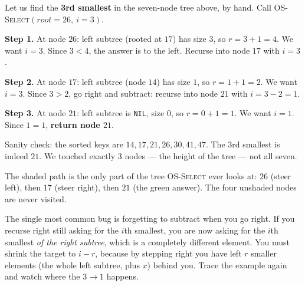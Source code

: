 \begin{labbox}
Let us find the \textbf{3rd smallest} in the seven-node tree above, by hand.
Call \textsc{OS-Select}$(\mathit{root}=26,\ i=3)$.

\textbf{Step 1.} At node $26$: left subtree (rooted at $17$) has size $3$, so
$r = 3 + 1 = 4$. We want $i = 3$. Since $3 < 4$, the answer is to the left.
Recurse into node $17$ with $i = 3$.

\textbf{Step 2.} At node $17$: left subtree (node $14$) has size $1$, so
$r = 1 + 1 = 2$. We want $i = 3$. Since $3 > 2$, go right and subtract:
recurse into node $21$ with $i = 3 - 2 = 1$.

\textbf{Step 3.} At node $21$: left subtree is \texttt{NIL}, size $0$, so
$r = 0 + 1 = 1$. We want $i = 1$. Since $1 = 1$, \textbf{return node $21$}.

Sanity check: the sorted keys are $14, 17, 21, 26, 30, 41, 47$. The 3rd smallest
is indeed $21$. We touched exactly $3$ nodes --- the height of the tree --- not all
seven.

\begin{center}
\end{center}

The shaded path is the only part of the tree \textsc{OS-Select} ever looks at:
$26$ (steer left), then $17$ (steer right), then $21$ (the green answer). The
four unshaded nodes are never visited.
\end{labbox}

\begin{trapbox}
The single most common bug is forgetting to subtract when you go right. If you
recurse right still asking for the $i$th smallest, you are now asking for the
$i$th smallest \emph{of the right subtree}, which is a completely different
element. You must shrink the target to $i - r$, because by stepping right you
have left $r$ smaller elements (the whole left subtree, plus $x$) behind you.
Trace the example again and watch where the $3 \to 1$ happens.
\end{trapbox}

